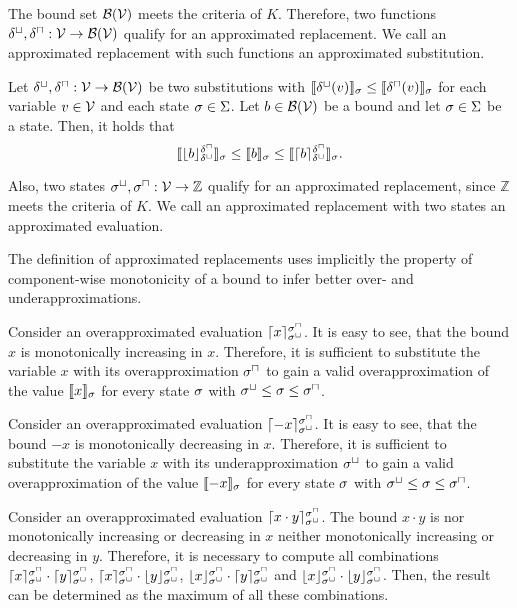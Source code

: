 The bound set $\mathcal{B}(\mathcal{V})$ meets the criteria of $K$.
Therefore, two functions $\delta^\sqcup, \delta^\sqcap: \mathcal{V} \rightarrow \mathcal{B}(\mathcal{V})$ qualify for an approximated replacement.
We call an approximated replacement with such functions an approximated substitution.

\begin{theorem}
  Let $\delta^\sqcup, \delta^\sqcap: \mathcal{V} \rightarrow \mathcal{B}(\mathcal{V})$ be two substitutions with $\llbracket \delta^\sqcup(v) \rrbracket_{\sigma} \leq \llbracket \delta^\sqcap(v) \rrbracket_{\sigma}$ for each variable $v \in \mathcal{V}$ and each state $\sigma \in \Sigma$.
  Let $b \in \mathcal{B}(\mathcal{V})$ be a bound and let $\sigma \in \Sigma$ be a state.
  Then, it holds that
  \[ \llbracket \lfloor b \rfloor^{\delta^\sqcap}_{\delta^\sqcup} \rrbracket_{\sigma} \leq \llbracket b \rrbracket_{\sigma} \leq \llbracket \lceil b \rceil^{\delta^\sqcap}_{\delta^\sqcup} \rrbracket_{\sigma}. \]
\end{theorem}

Also, two states ${\sigma^\sqcup}, {\sigma^\sqcap}: \mathcal{V} \rightarrow \mathbb{Z}$ qualify for an approximated replacement, since $\mathbb{Z}$ meets the criteria of $K$.
We call an approximated replacement with two states an approximated evaluation.



The definition of approximated replacements uses implicitly the property of component-wise monotonicity of a bound to infer better over- and underapproximations.

Consider an overapproximated evaluation $\lceil x \rceil^{{\sigma^\sqcap}}_{{\sigma^\sqcup}}$.
It is easy to see, that the bound $x$ is monotonically increasing in $x$.
Therefore, it is sufficient to substitute the variable $x$ with its overapproximation ${\sigma^\sqcap}$ to gain a valid overapproximation of the value $\llbracket x \rrbracket_{\sigma}$ for every state $\sigma$ with ${\sigma^\sqcup} \leq \sigma \leq {\sigma^\sqcap}$.

Consider an overapproximated evaluation $\lceil -x \rceil^{{\sigma^\sqcap}}_{{\sigma^\sqcup}}$.
It is easy to see, that the bound $-x$ is monotonically decreasing in $x$.
Therefore, it is sufficient to substitute the variable $x$ with its underapproximation ${\sigma^\sqcup}$ to gain a valid overapproximation of the value $\llbracket -x \rrbracket_{\sigma}$ for every state $\sigma$ with ${\sigma^\sqcup} \leq \sigma \leq {\sigma^\sqcap}$.

Consider an overapproximated evaluation $\lceil x \cdot y \rceil^{{\sigma^\sqcap}}_{{\sigma^\sqcup}}$.
The bound $x \cdot y$ is nor monotonically increasing or decreasing in $x$ neither monotonically increasing or decreasing in $y$.
Therefore, it is necessary to compute all combinations $\lceil x \rceil^{{\sigma^\sqcap}}_{{\sigma^\sqcup}} \cdot \lceil y \rceil^{{\sigma^\sqcap}}_{{\sigma^\sqcup}}$, $\lceil x \rceil^{{\sigma^\sqcap}}_{{\sigma^\sqcup}} \cdot \lfloor y \rfloor^{{\sigma^\sqcap}}_{{\sigma^\sqcup}}$, $\lfloor x \rfloor^{{\sigma^\sqcap}}_{{\sigma^\sqcup}} \cdot \lceil y \rceil^{{\sigma^\sqcap}}_{{\sigma^\sqcup}}$ and $\lfloor x \rfloor^{{\sigma^\sqcap}}_{{\sigma^\sqcup}} \cdot \lfloor y \rfloor^{{\sigma^\sqcap}}_{{\sigma^\sqcup}}$.
Then, the result can be determined as the maximum of all these combinations.

